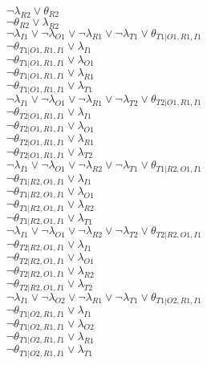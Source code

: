 $\neg\lambda_{R2} \vee \theta_{R2}$\\
$\neg\theta_{R2} \vee \lambda_{R2}$\\
$\neg\lambda_{I1} \vee \neg\lambda_{O1} \vee \neg\lambda_{R1} \vee \neg\lambda_{T1} \vee \theta_{T1|O1,R1,I1}$\\
$\neg\theta_{T1|O1,R1,I1} \vee \lambda_{I1}$\\
$\neg\theta_{T1|O1,R1,I1} \vee \lambda_{O1}$\\
$\neg\theta_{T1|O1,R1,I1} \vee \lambda_{R1}$\\
$\neg\theta_{T1|O1,R1,I1} \vee \lambda_{T1}$\\
$\neg\lambda_{I1} \vee \neg\lambda_{O1} \vee \neg\lambda_{R1} \vee \neg\lambda_{T2} \vee \theta_{T2|O1,R1,I1}$\\
$\neg\theta_{T2|O1,R1,I1} \vee \lambda_{I1}$\\
$\neg\theta_{T2|O1,R1,I1} \vee \lambda_{O1}$\\
$\neg\theta_{T2|O1,R1,I1} \vee \lambda_{R1}$\\
$\neg\theta_{T2|O1,R1,I1} \vee \lambda_{T2}$\\
$\neg\lambda_{I1} \vee \neg\lambda_{O1} \vee \neg\lambda_{R2} \vee \neg\lambda_{T1} \vee \theta_{T1|R2,O1,I1}$\\
$\neg\theta_{T1|R2,O1,I1} \vee \lambda_{I1}$\\
$\neg\theta_{T1|R2,O1,I1} \vee \lambda_{O1}$\\
$\neg\theta_{T1|R2,O1,I1} \vee \lambda_{R2}$\\
$\neg\theta_{T1|R2,O1,I1} \vee \lambda_{T1}$\\
$\neg\lambda_{I1} \vee \neg\lambda_{O1} \vee \neg\lambda_{R2} \vee \neg\lambda_{T2} \vee \theta_{T2|R2,O1,I1}$\\
$\neg\theta_{T2|R2,O1,I1} \vee \lambda_{I1}$\\
$\neg\theta_{T2|R2,O1,I1} \vee \lambda_{O1}$\\
$\neg\theta_{T2|R2,O1,I1} \vee \lambda_{R2}$\\
$\neg\theta_{T2|R2,O1,I1} \vee \lambda_{T2}$\\
$\neg\lambda_{I1} \vee \neg\lambda_{O2} \vee \neg\lambda_{R1} \vee \neg\lambda_{T1} \vee \theta_{T1|O2,R1,I1}$\\
$\neg\theta_{T1|O2,R1,I1} \vee \lambda_{I1}$\\
$\neg\theta_{T1|O2,R1,I1} \vee \lambda_{O2}$\\
$\neg\theta_{T1|O2,R1,I1} \vee \lambda_{R1}$\\
$\neg\theta_{T1|O2,R1,I1} \vee \lambda_{T1}$\\
